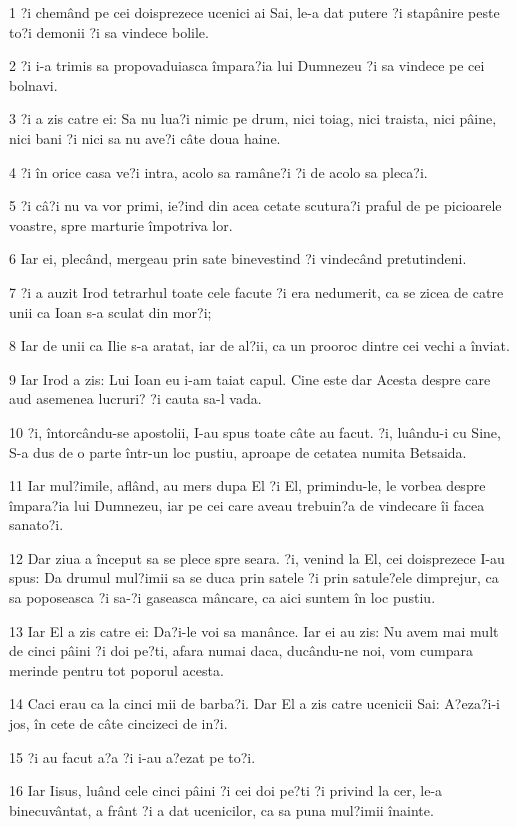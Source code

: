 \par 1 ?i chemând pe cei doisprezece ucenici ai Sai, le-a dat putere ?i stapânire peste to?i demonii ?i sa vindece bolile.
\par 2 ?i i-a trimis sa propovaduiasca împara?ia lui Dumnezeu ?i sa vindece pe cei bolnavi.
\par 3 ?i a zis catre ei: Sa nu lua?i nimic pe drum, nici toiag, nici traista, nici pâine, nici bani ?i nici sa nu ave?i câte doua haine.
\par 4 ?i în orice casa ve?i intra, acolo sa ramâne?i ?i de acolo sa pleca?i.
\par 5 ?i câ?i nu va vor primi, ie?ind din acea cetate scutura?i praful de pe picioarele voastre, spre marturie împotriva lor.
\par 6 Iar ei, plecând, mergeau prin sate binevestind ?i vindecând pretutindeni.
\par 7 ?i a auzit Irod tetrarhul toate cele facute ?i era nedumerit, ca se zicea de catre unii ca Ioan s-a sculat din mor?i;
\par 8 Iar de unii ca Ilie s-a aratat, iar de al?ii, ca un prooroc dintre cei vechi a înviat.
\par 9 Iar Irod a zis: Lui Ioan eu i-am taiat capul. Cine este dar Acesta despre care aud asemenea lucruri? ?i cauta sa-l vada.
\par 10 ?i, întorcându-se apostolii, I-au spus toate câte au facut. ?i, luându-i cu Sine, S-a dus de o parte într-un loc pustiu, aproape de cetatea numita Betsaida.
\par 11 Iar mul?imile, aflând, au mers dupa El ?i El, primindu-le, le vorbea despre împara?ia lui Dumnezeu, iar pe cei care aveau trebuin?a de vindecare îi facea sanato?i.
\par 12 Dar ziua a început sa se plece spre seara. ?i, venind la El, cei doisprezece I-au spus: Da drumul mul?imii sa se duca prin satele ?i prin satule?ele dimprejur, ca sa poposeasca ?i sa-?i gaseasca mâncare, ca aici suntem în loc pustiu.
\par 13 Iar El a zis catre ei: Da?i-le voi sa manânce. Iar ei au zis: Nu avem mai mult de cinci pâini ?i doi pe?ti, afara numai daca, ducându-ne noi, vom cumpara merinde pentru tot poporul acesta.
\par 14 Caci erau ca la cinci mii de barba?i. Dar El a zis catre ucenicii Sai: A?eza?i-i jos, în cete de câte cincizeci de in?i.
\par 15 ?i au facut a?a ?i i-au a?ezat pe to?i.
\par 16 Iar Iisus, luând cele cinci pâini ?i cei doi pe?ti ?i privind la cer, le-a binecuvântat, a frânt ?i a dat ucenicilor, ca sa puna mul?imii înainte.
